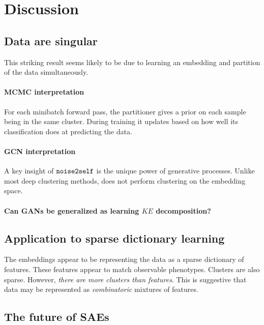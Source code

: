 \section{Discussion}

\subsection{Data are singular}
This striking result seems likely to be due to learning an embedding and partition of the data simultaneously.

\paragraph{MCMC interpretation}
For each minibatch forward pass, the partitioner gives a prior on each sample being in the same cluster.
During training it updates based on how well its classification does at predicting the data.

\paragraph{GCN interpretation}
A key insight of $\mathop{\mathtt{noise2self}}\limits$ is the unique power of generative processes.
Unlike most deep clustering methods, \DeePWAK does not perform clustering on the embedding space.


\paragraph{Can GANs be generalized as learning $KE$ decomposition?}

\subsection{Application to sparse dictionary learning}

The embeddings appear to be representing the data as a sparse dictionary of features.
These features appear to match observable phenotypes.
Clusters are also sparse. However, \textit{there are more clusters than features}.
This is suggestive that data may be represented as \textit{combinatoric} mixtures of features. 

\subsection{The future of SAEs}

